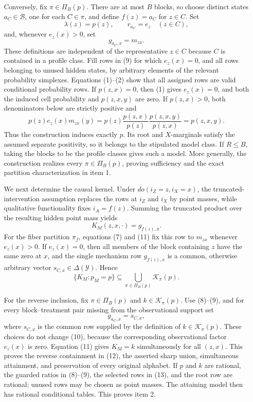 Conversely, fix \(\pi\in\Pi_B(p)\).  There are at most \(B\) blocks, so
choose distinct states \(a_C\in\mathcal B\), one for each
\(C\in\pi\), and define \(f(z)=a_C\) for \(z\in C\).  Set
\[
 \lambda(z)=p(z),\qquad
 r_{a_C}=e_z\quad(z\in C),
 \tag{8}
\]
and, whenever \(e_z(x)>0\), set
\[
 g_{a_C,x}=m_{zx}.
 \tag{9}
\]
These definitions are independent of the representative \(z\in C\)
because \(C\) is contained in a profile class.  Fill rows in (9) for
which \(e_z(x)=0\), and all rows belonging to unused hidden states, by
arbitrary elements of the relevant probability simplexes.  Equations
(1)--(2) show that all assigned rows are valid conditional probability
rows.  If \(p(z,x)=0\), then (1) gives \(e_z(x)=0\), and both the
induced cell probability and \(p(z,x,y)\) are zero.  If
\(p(z,x)>0\), both denominators below are strictly positive and
\[
 p(z)e_z(x)m_{zx}(y)
 =p(z)\frac{p(z,x)}{p(z)}
       \frac{p(z,x,y)}{p(z,x)}
 =p(z,x,y).
 \tag{10}
\]
Thus the construction induces exactly \(p\).  Its root and
\(X\)-marginals satisfy the assumed separate positivity, so it belongs
to the stipulated model class.  If \(R\leq B\), taking the blocks to be
the profile classes gives such a model.  More generally, the construction
realizes every \(\pi\in\Pi_B(p)\), proving sufficiency and the exact
partition characterization in item 1.

We next determine the causal kernel.  Under
\(do(i_Z=z,i_X=x)\), the truncated-intervention assumption replaces the
rows at \(i_Z\) and \(i_X\) by point masses, while qualitative
functionality fixes \(i_A=f(z)\).  Summing the truncated product over
the resulting hidden point mass yields
\[
 K_M(z,x,\cdot)=g_{f(z),x}.
 \tag{11}
\]
For the fiber partition \(\pi_f\), equations (7) and (11) fix this row
to \(m_{zx}\) whenever \(e_z(x)>0\).  If \(e_z(x)=0\), then all
members of the block containing \(z\) have the same zero at \(x\), and
the single mechanism row \(g_{f(z),x}\) is a common, otherwise arbitrary
vector \(s_{C,x}\in\Delta(\mathcal Y)\).  Hence
\[
 \{K_M:p_M=p\}
 \subseteq \bigcup_{\pi\in\Pi_B(p)}\mathcal K_\pi(p).
 \tag{12}
\]

For the reverse inclusion, fix \(\pi\in\Pi_B(p)\) and
\(k\in\mathcal K_\pi(p)\).  Use (8)--(9), and for every block--treatment
pair missing from the observational support set
\[
 g_{a_C,x}=s_{C,x},
 \tag{13}
\]
where \(s_{C,x}\) is the common row supplied by the definition of
\(k\in\mathcal K_\pi(p)\).  These choices do not change (10), because
the corresponding observational factor \(e_z(x)\) is zero.  Equation
(11) gives \(K_M=k\) simultaneously for all \((z,x)\).  This proves the
reverse containment in (12), the asserted sharp union, simultaneous
attainment, and preservation of every original alphabet.  If \(p\) and
\(k\) are rational, the guarded ratios in (8)--(9), the selected rows in
(13), and the root row are rational; unused rows may be chosen as point
masses.  The attaining model then has rational conditional tables.  This
proves item 2.

